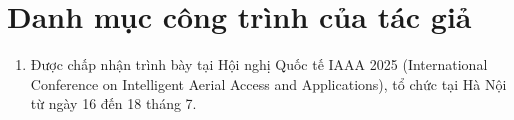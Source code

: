 \chapter*{Danh mục công trình của tác giả}
\label{Appendix1}

\begin{enumerate}
\item Được chấp nhận trình bày tại Hội nghị Quốc tế IAAA 2025 (International Conference on Intelligent Aerial Access and Applications), tổ chức tại Hà Nội từ ngày 16 đến 18 tháng 7.
\end{enumerate}